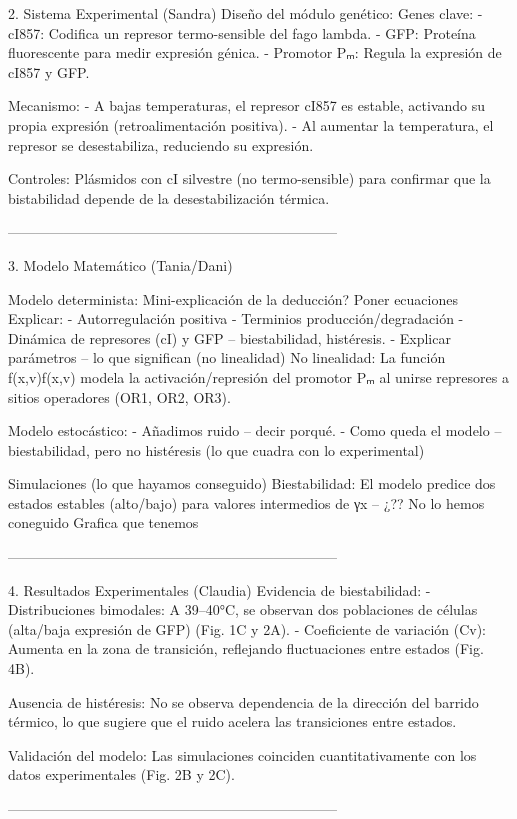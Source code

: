 2. Sistema Experimental (Sandra)
Diseño del módulo genético:
Genes clave:
- cI857: Codifica un represor termo-sensible del fago lambda.
- GFP: Proteína fluorescente para medir expresión génica.
- Promotor Pₘ: Regula la expresión de cI857 y GFP.

Mecanismo:
- A bajas temperaturas, el represor cI857 es estable, activando su propia expresión (retroalimentación positiva).
- Al aumentar la temperatura, el represor se desestabiliza, reduciendo su expresión.

Controles: Plásmidos con cI silvestre (no termo-sensible) para confirmar que la bistabilidad depende de la desestabilización térmica.

-----------------------------------------------------------------------

3. Modelo Matemático (Tania/Dani)

Modelo determinista:
Mini-explicación de la deducción?
Poner ecuaciones
Explicar:
-	Autorregulación positiva
-	Terminios producción/degradación
-	Dinámica de represores (cI) y GFP – biestabilidad, histéresis.
-	Explicar parámetros – lo que significan (no linealidad)
No linealidad: La función f(x,v)f(x,v) modela la activación/represión del promotor Pₘ al unirse represores a sitios operadores (OR1, OR2, OR3).

Modelo estocástico:
-	Añadimos ruido – decir porqué. 
-	Como queda el modelo – biestabilidad, pero no histéresis (lo que cuadra con lo experimental)

Simulaciones (lo que hayamos conseguido)
Biestabilidad: El modelo predice dos estados estables (alto/bajo) para valores intermedios de γx – ¿?? No lo hemos coneguido
Grafica que tenemos

-----------------------------------------------------------------------

4. Resultados Experimentales (Claudia)
Evidencia de biestabilidad:
- Distribuciones bimodales: A 39–40°C, se observan dos poblaciones de células (alta/baja expresión de GFP) (Fig. 1C y 2A).
- Coeficiente de variación (Cv): Aumenta en la zona de transición, reflejando fluctuaciones entre estados (Fig. 4B).

Ausencia de histéresis:
No se observa dependencia de la dirección del barrido térmico, lo que sugiere que el ruido acelera las transiciones entre estados.

Validación del modelo:
Las simulaciones coinciden cuantitativamente con los datos experimentales (Fig. 2B y 2C).

-----------------------------------------------------------------------

